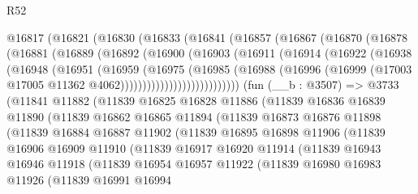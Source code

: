 \begin{lexlean}{R52}
\begin{coremodule}
    @16817
      (@16821
        (@16830
          (@16833
            (@16841
              (@16857
                (@16867
                  (@16870
                    (@16878
                      (@16881
                        (@16889
                          (@16892
                            (@16900
                              (@16903
                                (@16911
                                  (@16914
                                    (@16922
                                      (@16938
                                        (@16948
                                          (@16951
                                            (@16959
                                              (@16975
                                                (@16985
                                                  (@16988
                                                    (@16996
                                                      (@16999
                                                        (@17003
                                                          @17005
                                                          @11362
                                                          @4062)))))))))))))))))))))))))))
    (fun (__b : @3507) =>
    @3733
      (@11841
        @11882
        (@11839
          @16825
          @16828
          @11886
          (@11839
            @16836
            @16839
            @11890
            (@11839
              @16862
              @16865
              @11894
              (@11839
                @16873
                @16876
                @11898
                (@11839
                  @16884
                  @16887
                  @11902
                  (@11839
                    @16895
                    @16898
                    @11906
                    (@11839
                      @16906
                      @16909
                      @11910
                      (@11839
                        @16917
                        @16920
                        @11914
                        (@11839
                          @16943
                          @16946
                          @11918
                          (@11839
                            @16954
                            @16957
                            @11922
                            (@11839
                              @16980
                              @16983
                              @11926
                              (@11839
                                @16991
                                @16994

\end{coremodule}
\end{lexlean}
